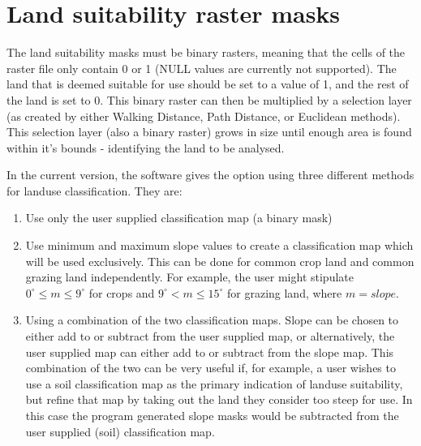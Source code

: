 \section{Land suitability raster masks} 

The land suitability masks must be binary rasters, meaning that the cells of
the raster file only contain 0 or 1 (NULL values are currently not supported).
The land that is deemed suitable for use should be set to a value of 1, and the
rest of the land is set to 0.  This binary raster  can then be multiplied by a
selection layer (as created by either Walking Distance, Path Distance,
or Euclidean methods).  This selection layer (also a binary raster) grows in
size until enough area is
found within it's bounds - identifying the land to be analysed.

In the current version, the software gives the option using three different
methods for landuse classification.  They are: 

\begin{enumerate} 

\item  Use only the user supplied classification map (a binary mask) 
\item  Use minimum and maximum slope values to create a classification map
  which will be used exclusively.  This can be done for common crop land and
  common grazing land independently.  For example, the user might stipulate
  $0^\circ \leq m \leq 9^\circ$ for crops and $9^\circ < m \leq 15^\circ$ for
  grazing land, where $m=slope$.  
\item  Using a combination of the two classification maps.  Slope can be chosen
  to either add to or subtract from the user supplied map, or alternatively, the
  user supplied map can either add to or subtract from the slope map.  This
  combination of the two can be very useful if, for example, a user wishes to use
  a soil classification map as the primary indication of landuse suitability, but
  refine that map by taking out the land they consider too steep for use.  In
  this case the program generated slope masks would be subtracted from the user
  supplied (soil) classification map.  
\end{enumerate}

